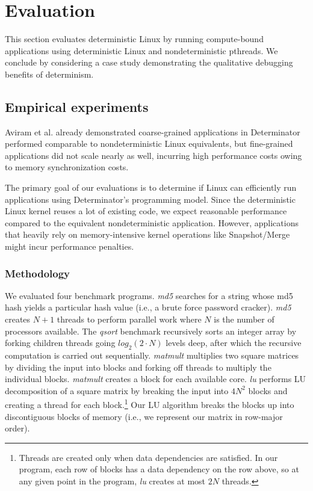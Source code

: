 
\section{Evaluation}
\label{sec:eval}

This section evaluates deterministic Linux by running compute-bound
applications using deterministic Linux and nondeterministic pthreads.
We conclude by considering a case study demonstrating the qualitative debugging
benefits of determinism.

\subsection{Empirical experiments}

Aviram et al. already demonstrated coarse-grained applications in Determinator
performed comparable to nondeterministic Linux equivalents, but fine-grained
applications did not scale nearly as well, incurring high performance costs
owing to memory synchronization costs.





The primary goal of our evaluations is to determine if Linux can efficiently run
applications using Determinator's programming model. Since the deterministic
Linux kernel reuses a lot of existing code, we expect reasonable
performance compared to the equivalent nondeterministic application. However,
applications that heavily rely on memory-intensive kernel operations like
Snapshot/Merge might incur performance penalties.

\subsubsection{Methodology}
We evaluated four benchmark programs. \emph{md5} searches for a string whose
md5 hash yields a particular hash value (i.e., a brute force password cracker).
\emph{md5} creates $N+1$ threads to perform parallel work where $N$ is the
number of processors available. The \emph{qsort} benchmark recursively sorts an
integer array by forking children threads going $log_2(2\cdot N)$ levels deep,
after which the recursive computation is carried out sequentially.
\emph{matmult} multiplies two square matrices by dividing the input into
blocks and forking off threads to multiply the individual blocks. \emph{matmult}
creates a block for each available core. \emph{lu}
performs LU decomposition of a square matrix by breaking the input into $4N^2$
blocks and creating a thread for each block.\footnote{Threads are created only
when data dependencies are satisfied. In our program, each row of blocks has a
data dependency on the row above, so at any given point in the program,
\emph{lu} creates at most $2N$ threads.}
Our LU algorithm breaks the blocks up into discontiguous blocks of memory (i.e.,
we represent our matrix in row-major order).

